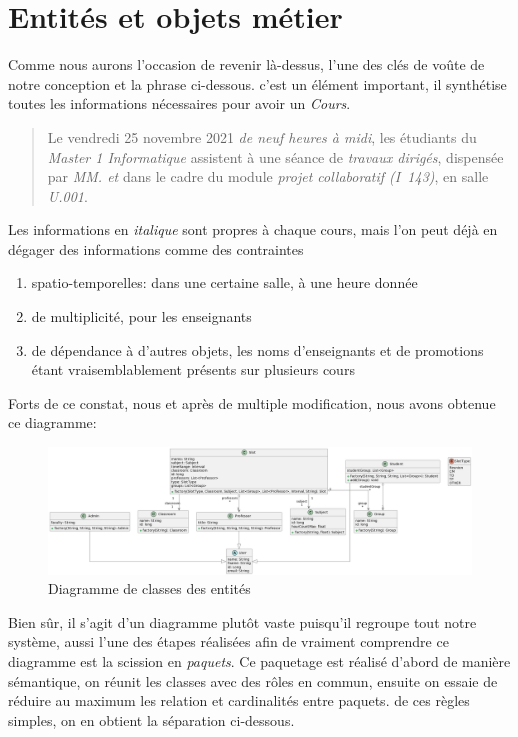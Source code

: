 \documentclass[a4paper,french,final]{memoir}
\begin{document}
\section{Entités et objets métier}
Comme nous aurons l'occasion de revenir là-dessus, l'une des clés de voûte de notre conception et la phrase ci-dessous. c'est un élément important,
il synthétise toutes les informations nécessaires pour avoir un \emph{Cours}.
\begin{quote}
    Le vendredi 25 novembre 2021 \textit{de neuf heures à midi}, les étudiants du \textit{Master 1 Informatique} assistent à  une séance de \textit{travaux dirigés}, dispensée par \textit{MM.  et } dans le cadre du module \textit{projet collaboratif (I~143)}, en salle \textit{U.001}.
\end{quote}
Les informations en \emph{italique} sont propres à chaque cours, mais l'on peut déjà en dégager des informations comme des contraintes
\begin{enumerate}
    \item  spatio-temporelles: dans une certaine salle, à une heure donnée
    \item  de multiplicité, pour les enseignants
    \item de dépendance à d'autres objets, les noms d'enseignants et de promotions étant vraisemblablement présents sur plusieurs cours
\end{enumerate}
\clearpage
Forts de ce constat, nous et après de multiple modification, nous avons obtenue ce diagramme:
\begin{figure}[!h]
    \centering
    \includegraphics[width=1.1\textwidth]{figures/diag_classe.png}
    \caption{Diagramme de classes des entités}
    \label{fig:diag_classes}
\end{figure}

Bien sûr, il s'agit d'un diagramme plutôt vaste puisqu'il regroupe tout notre système, aussi l'une des étapes réalisées afin de vraiment comprendre
ce diagramme est la scission en \emph{paquets}. Ce paquetage est réalisé d'abord de manière sémantique, on réunit les classes avec des rôles en commun, ensuite 
on essaie de réduire au maximum les relation et cardinalités entre paquets. de ces règles simples, on en obtient la séparation ci-dessous.
\begin{center}
    
\end{center}
\end{document}
